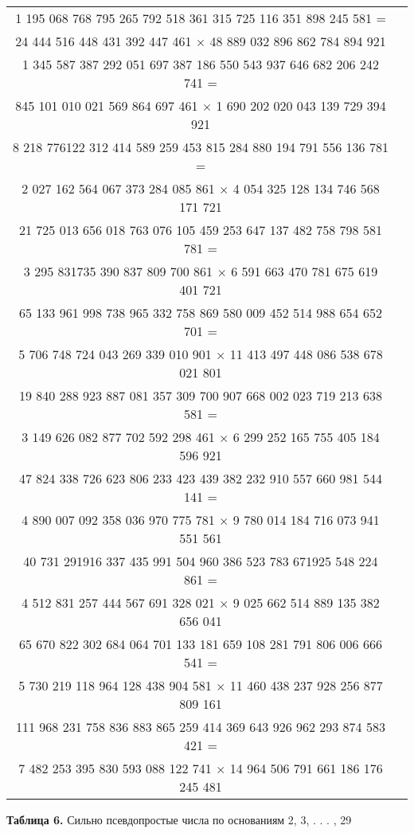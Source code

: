  	\begin{tabular}{|c|l|}
 		\hline
 		1 195 068 768 795 265 792 518 361 315 725 116 351 898 245 581 = \\ 24 444 516 448 431 392 447 461 $\times$ 48 889 032 896 862 784 894 921 \\
 		\hline
 		1 345 587 387 292 051 697 387 186 550 543 937 646 682 206 242 741 = \\ 845 101 010 021 569 864 697 461 $\times$ 1 690 202 020 043 139 729 394 921 \\
 		\hline
 		8 218 776122 312 414 589 259 453 815 284 880 194 791 556 136 781 = \\ 2 027 162 564 067 373 284 085 861 $\times$ 4 054 325 128 134 746 568 171 721 \\
 		\hline
 		21 725 013 656 018 763 076 105 459 253 647 137 482 758 798 581 781 = \\ 3 295 831735 390 837 809 700 861 $\times$ 6 591 663 470 781 675 619 401 721 \\ 
 		\hline 
 		65 133 961 998 738 965 332 758 869 580 009 452 514 988 654 652 701 = \\ 5 706 748 724 043 269 339 010 901 $\times$ 11 413 497 448 086 538 678 021 801 \\ 
 		\hline
 		19 840 288 923 887 081 357 309 700 907 668 002 023 719 213 638 581 = \\ 3 149 626 082 877 702 592 298 461 $\times$ 6 299 252 165 755 405 184 596 921 \\ 
 		\hline
 		47 824 338 726 623 806 233 423 439 382 232 910 557 660 981 544 141 = \\ 4 890 007 092 358 036 970 775 781 $\times$ 9 780 014 184 716 073 941 551 561 \\ 
 		\hline
 		40 731 291916 337 435 991 504 960 386 523 783 671925 548 224 861 = \\ 4 512 831 257 444 567 691 328 021 $\times$ 9 025 662 514 889 135 382 656 041 \\ 
 		\hline
 		65 670 822 302 684 064 701 133 181 659 108 281 791 806 006 666 541 = \\ 5 730 219 118 964 128 438 904 581 $\times$ 11 460 438 237 928 256 877 809 161 \\ 
 		\hline
 		111 968 231 758 836 883 865 259 414 369 643 926 962 293 874 583 421 = \\ 7 482 253 395 830 593 088 122 741 $\times$ 14 964 506 791 661 186 176 245 481 \\
 		\hline
	\end{tabular}
	\begin{center}
		{\bf Таблица 6.} Сильно псевдопростые числа по основаниям 2, 3, . . . , 29
	\end{center}

